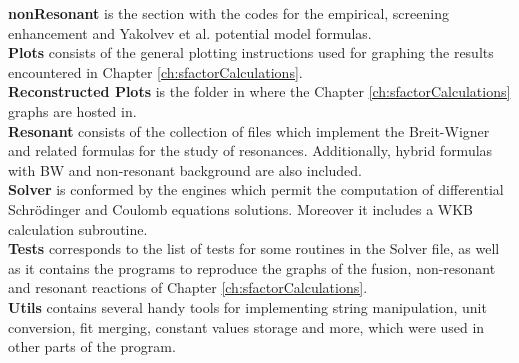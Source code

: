 \documentclass[openany]{book}
\begin{document}
\textbf{nonResonant} is the section with the codes for the empirical, screening enhancement and Yakolvev et al.  potential model formulas. \\

\textbf{Plots} consists of the general plotting instructions used for graphing the results encountered in Chapter \ref{ch:sfactorCalculations}. \\

\textbf{Reconstructed Plots} is the folder in where the Chapter \ref{ch:sfactorCalculations} graphs are hosted in. \\

\textbf{Resonant} consists of the collection of files which implement the Breit-Wigner and related formulas for the study of resonances. Additionally, hybrid formulas with BW and non-resonant background are also included. \\

\textbf{Solver} is conformed by the engines which permit the computation of differential Schrödinger and Coulomb equations solutions. Moreover it includes a WKB calculation subroutine. \\

\textbf{Tests} corresponds to the list of tests for some routines in the Solver file, as well as it contains the programs to reproduce the graphs of the fusion, non-resonant and resonant reactions of Chapter \ref{ch:sfactorCalculations}. \\

\textbf{Utils} contains several handy tools for implementing string manipulation, unit conversion, fit merging, constant values storage and more, which were used in other parts of the program. 

\newpage


\end{document}

